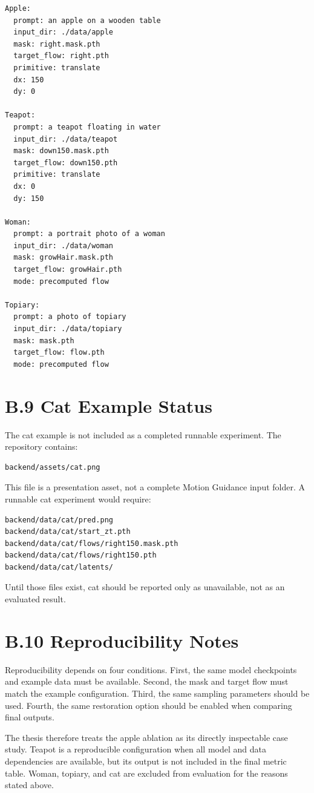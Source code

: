 \begin{verbatim}
Apple:
  prompt: an apple on a wooden table
  input_dir: ./data/apple
  mask: right.mask.pth
  target_flow: right.pth
  primitive: translate
  dx: 150
  dy: 0

Teapot:
  prompt: a teapot floating in water
  input_dir: ./data/teapot
  mask: down150.mask.pth
  target_flow: down150.pth
  primitive: translate
  dx: 0
  dy: 150

Woman:
  prompt: a portrait photo of a woman
  input_dir: ./data/woman
  mask: growHair.mask.pth
  target_flow: growHair.pth
  mode: precomputed flow

Topiary:
  prompt: a photo of topiary
  input_dir: ./data/topiary
  mask: mask.pth
  target_flow: flow.pth
  mode: precomputed flow
\end{verbatim}

\section*{B.9 Cat Example Status}

The cat example is not included as a completed runnable experiment. The repository contains:

\begin{verbatim}
backend/assets/cat.png
\end{verbatim}

This file is a presentation asset, not a complete Motion Guidance input folder. A runnable cat experiment would require:

\begin{verbatim}
backend/data/cat/pred.png
backend/data/cat/start_zt.pth
backend/data/cat/flows/right150.mask.pth
backend/data/cat/flows/right150.pth
backend/data/cat/latents/
\end{verbatim}

Until those files exist, cat should be reported only as unavailable, not as an evaluated result.

\section*{B.10 Reproducibility Notes}

Reproducibility depends on four conditions. First, the same model checkpoints and example data must be available. Second, the mask and target flow must match the example configuration. Third, the same sampling parameters should be used. Fourth, the same restoration option should be enabled when comparing final outputs.

The thesis therefore treats the apple ablation as its directly inspectable case study. Teapot is a reproducible configuration when all model and data dependencies are available, but its output is not included in the final metric table. Woman, topiary, and cat are excluded from evaluation for the reasons stated above.

